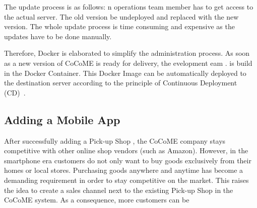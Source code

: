 The  update process is as follows:
n operations team member has to get access to the actual server.
The old version  be undeployed and replaced with the new version. 
The whole update process is time consuming and expensive as the updates have to be done manually.

Therefore, Docker is elaborated to simplify the administration process. 
As soon as a new  version of CoCoME is ready for delivery, the evelopment eam .
\CoCoME is build in the Docker Container.
This Docker Image can be automatically deployed to the destination server according to the principle of Continuous Deployment (CD)~\cite{olsson2012climbing}. 




\subsection{Adding a Mobile App}
After successfully adding a Pick-up Shop
, the CoCoME company stays competitive with other online shop vendors (such as Amazon). 
However, in the smartphone era customers do not only want to buy goods exclusively from their homes or local stores. %
Purchasing goods anywhere and anytime has become a demanding requirement in order to stay competitive on the market. %
This raises the idea to create a  sales channel next to the existing Pick-up Shop  in the CoCoME system. 
As a consequence, more customers can be  

